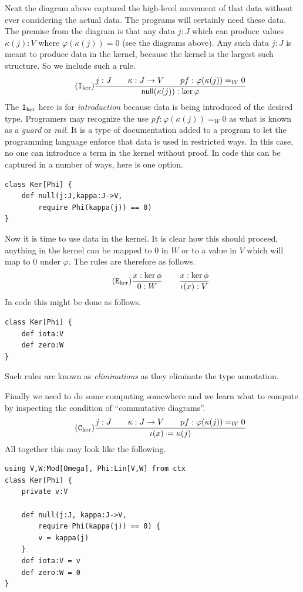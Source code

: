 \documentclass[12pt,twoside,dvipsnames,letterpaper]{memoir}
\begin{document}
Next the diagram above captured the high-level movement of that data without 
ever considering the actual data.  The programs will certainly need these 
data.  The premise from the diagram is that any data $j:J$ which can produce 
values $\kappa(j):V$ where $\varphi(\kappa(j))=0$ (see the diagrams above).
Any such data $j:J$ is meant to produce data in the kernel, because the 
kernel is the largest such structure.  So we include such a rule.
\begin{gather}
    \tag{$\intro{\ker}$}
    \frac{
        j:J\qquad \kappa:J\to V\qquad pf:\varphi(\kappa(j))=_W 0
    }{
        \mathsf{null}(\kappa(j)):\ker\varphi
    }
\end{gather}
The $\mathtt{I}_{\ker}$ here is for \emph{introduction} because data is 
being introduced of the desired type.
Programers may recognize the use $pf:\varphi(\kappa(j))=_W 0$ as what is known 
as a \emph{guard} or \emph{rail}.  It is a type of documentation added to a 
program to let the programming language enforce that data is used in restricted 
ways.  In this case, no one can introduce a term in the kernel without proof.
In code this can be captured in a number of ways, here is one option.
\begin{lstlisting}[language=Sava]
class Ker[Phi] {
    def null(j:J,kappa:J->V, 
        require Phi(kappa(j)) == 0)
}
\end{lstlisting}

Now it is time to use data in the kernel.  It is clear how this should 
proceed, anything in the kernel can be mapped to $0$ in $W$ or to a 
value in $V$ which will map to $0$ under $\varphi$.  The rules are therefore 
as follows.    
\begin{gather}
    \tag{$\elim{\ker}$}
    \frac{
        x:\ker\phi
    }{
        0:W
    }\qquad
    \frac{
        x:\ker\phi
    }{
        \iota(x):V
    }
\end{gather}
In code this might be done as follows.
\begin{lstlisting}[language=Sava]
class Ker[Phi] {
    def iota:V 
    def zero:W
}
\end{lstlisting}
Such rules are known as \emph{eliminations} as they eliminate 
the type annotation.

Finally we need to do some computing somewhere and we learn 
what to compute by inspecting the condition of ``commutative diagrams''.
\begin{gather}
    \tag{$\comp{\ker}$}
    \frac{
        j:J\qquad \kappa:J\to V\qquad pf:\varphi(\kappa(j))=_W 0
    }{
        \iota(x) \defeq \kappa(j)
    }
\end{gather}
All together this may look like the following.
\begin{lstlisting}[language=Sava]
using V,W:Mod[Omega], Phi:Lin[V,W] from ctx
class Ker[Phi] {
    private v:V

    def null(j:J, kappa:J->V, 
        require Phi(kappa(j)) == 0) {
        v = kappa(j)    
    }
    def iota:V = v
    def zero:W = 0
}
\end{lstlisting}
\end{document}
